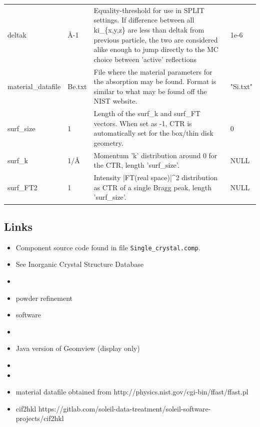 \begin{longtable}{p{}p{}p{}p{}}
deltak & \AA{}-1 & Equality-threshold for use in SPLIT settings. If difference between all ki\_\{x,y,z\} are less than deltak from previous particle, the two are considered alike enough to jump directly to the MC choice between 'active' reflections & 1e-6 \\
material\_datafile & Be.txt & File where the material parameters for the absorption may be found. Format is similar to what may be found off the NIST website. & "Si.txt" \\
surf\_size & 1 & Length of the surf\_k and surf\_FT vectors. When set as -1, CTR is automatically set for the box/thin disk geometry. & 0 \\
surf\_k & 1/\AA{} & Momentum 'k' distribution around 0 for the CTR, length 'surf\_size'. & NULL \\
surf\_FT2 & 1 & Intensity |FT(real space)|\textasciicircum{}2 distribution as CTR of a single Bragg peak, length 'surf\_size'. & NULL \\
\bottomrule
\end{longtable}

\subsection*{Links}
\begin{itemize}
  \item Component source code found in file \texttt{Single\_crystal.comp}.
  \item See  Inorganic Crystal Structure Database
  \item {}
  \item {} powder refinement
  \item {} software
  \item {}
  \item Java version of Geomview (display only) 
  \item {}
  \item {}
  \item material datafile obtained from http://physics.nist.gov/cgi-bin/ffast/ffast.pl
  \item cif2hkl https://gitlab.com/soleil-data-treatment/soleil-software-projects/cif2hkl
\end{itemize}
